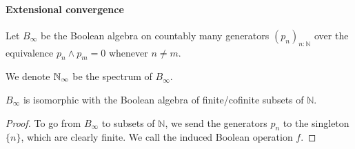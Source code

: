 \paragraph{Extensional convergence }  
\begin{definition}
  Let $B_\infty$ be the Boolean algebra on countably many generators $(p_n)_{n:\mathbb N}$ 
  over the equivalence $p_n\wedge p_m = 0 $ whenever $n \neq m$. 
\end{definition} 
\begin{definition}
  We denote $\mathbb{N}_{\infty}$ be the spectrum of $B_\infty$. 
\end{definition} 
\begin{lemma}
  $B_\infty$ is isomorphic with the Boolean algebra of 
  finite/cofinite subsets of $\mathbb N$. 
\end{lemma}
\begin{proof}
  To go from $B_\infty$ to subsets of $\mathbb N$, we send
  the generators $p_n$ to the singleton $\{n\}$, which are clearly finite. 
  We call the induced Boolean operation $f$. 


\end{proof}

